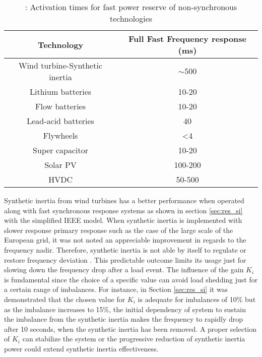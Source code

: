 \begin{table}[h]
	\caption{\label{tb:tech_times}: Activation times for fast power reserve of non-synchronous technologies \cite{miller2017technology}}
	\centering
	\begin{tabular}{cc}
		\toprule
		\textbf{Technology}     & \textbf{ Full Fast Frequency response (ms)}\\
		\midrule
		
		Wind turbine-Synthetic inertia&    $ \sim500 $\\
		Lithium batteries&    10-20\\
		Flow batteries&    10-20\\
		Lead-acid batteries&    40\\
		Flywheels&    <4\\
		Super capacitor&    10-20\\
		Solar PV&    100-200\\
		HVDC&    50-500\\
		
		\bottomrule
	\end{tabular}
\end{table}

Synthetic inertia from wind turbines has a better performance when operated along with fast synchronous response systems as shown in section \ref{sec:res_si} with the simplified IEEE model. When synthetic inertia is implemented with slower response primary response such as the case of the large scale of the European grid, it was not noted an appreciable improvement in regards to the frequency nadir. Therefore, synthetic inertia is not able by itself to regulate or restore frequency deviation \cite{Wu.2013}. This predictable outcome limits its usage just for slowing down the frequency drop after a load event.  The influence of the gain $ K_i $ is fundamental since the choice of a specific value can avoid load shedding just for a certain range of imbalances. For instance, in Section \ref{sec:res_si} it was demonstrated that the chosen value for $ K_i $ is adequate for imbalances of 10\% but as the imbalance increases to 15\%, the initial dependency of system to sustain the imbalance from the synthetic inertia makes the frequency to rapidly drop after 10 seconds, when the synthetic inertia has been removed. A proper selection of $ K_i $ can stabilize the system or the progressive reduction of synthetic inertia power could extend synthetic inertia effectiveness.\\


